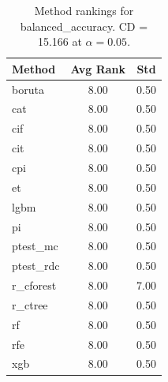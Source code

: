 \begin{table}[h]
\centering
\caption{Method rankings for balanced_accuracy. CD = 15.166 at $\alpha=0.05$.}
\label{tab:ranks_balanced_accuracy}
\begin{tabular}{lcc}
\toprule
Method & Avg Rank & Std \\
\midrule
boruta & 8.00 & 0.50 \\
cat & 8.00 & 0.50 \\
cif & 8.00 & 0.50 \\
cit & 8.00 & 0.50 \\
cpi & 8.00 & 0.50 \\
et & 8.00 & 0.50 \\
lgbm & 8.00 & 0.50 \\
pi & 8.00 & 0.50 \\
ptest_mc & 8.00 & 0.50 \\
ptest_rdc & 8.00 & 0.50 \\
r_cforest & 8.00 & 7.00 \\
r_ctree & 8.00 & 0.50 \\
rf & 8.00 & 0.50 \\
rfe & 8.00 & 0.50 \\
xgb & 8.00 & 0.50 \\
\bottomrule
\end{tabular}
\end{table}